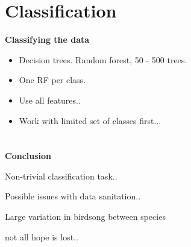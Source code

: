 \documentclass[t, xcolor={dvipsnames}]{beamer}
\begin{document}

\section{Classification}
\begin{frame}[fragile]
  \vspace{0.5cm}
  {\bfseries\Large Classifying the data}\\
  \vspace{0.5cm}
  \begin{addmargin}{0.5cm}
    \begin{itemize}
      \item Decision trees. Random forest, 50 - 500 trees.
      \item One RF per class.
      \item Use all features..
      \item Work with limited set of classes first...
    \end{itemize}
  \end{addmargin}
\end{frame}

\section{}
\begin{frame}[fragile]
  \vspace{0.5cm}
  {\bfseries\Large Conclusion}\\
  \vspace{0.5cm}
  \begin{addmargin}{0.5cm}
    \item Non-trivial classification task..
    \item Possible issues with data sanitation..
    \item Large variation in birdsong between species
    \item not all hope is lost..
  \end{addmargin}
\end{frame}


\end{document}
